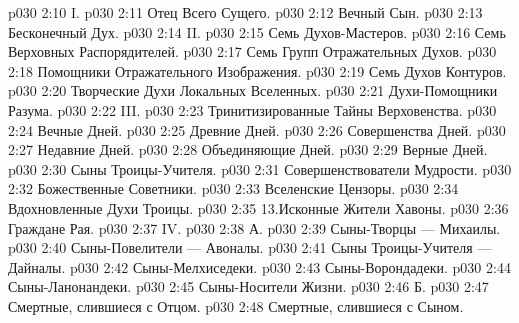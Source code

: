\vs p030 2:10 \pc I. 
\vs p030 2:11 \pc {}\bibnobreakspace Отец Всего Сущего.
\vs p030 2:12 \bibnobreakspace Вечный Сын.
\vs p030 2:13 \bibnobreakspace Бесконечный Дух.
\vs p030 2:14 \pc II. 
\vs p030 2:15 \bibnobreakspace Семь Духов\hyp{}Мастеров.
\vs p030 2:16 \bibnobreakspace Семь Верховных Распорядителей.
\vs p030 2:17 \bibnobreakspace Семь Групп Отражательных Духов.
\vs p030 2:18 \bibnobreakspace Помощники Отражательного Изображения.
\vs p030 2:19 \bibnobreakspace Семь Духов Контуров.
\vs p030 2:20 \bibnobreakspace Творческие Духи Локальных Вселенных.
\vs p030 2:21 \bibnobreakspace Духи\hyp{}Помощники Разума.
\vs p030 2:22 \pc III. 
\vs p030 2:23 \bibnobreakspace Тринитизированные Тайны Верховенства.
\vs p030 2:24 \bibnobreakspace Вечные Дней.
\vs p030 2:25 \bibnobreakspace Древние Дней.
\vs p030 2:26 \bibnobreakspace Совершенства Дней.
\vs p030 2:27 \bibnobreakspace Недавние Дней.
\vs p030 2:28 \bibnobreakspace Объединяющие Дней.
\vs p030 2:29 \bibnobreakspace Верные Дней.
\vs p030 2:30 \bibnobreakspace Сыны Троицы\hyp{}Учителя.
\vs p030 2:31 \bibnobreakspace Совершенствователи Мудрости.
\vs p030 2:32 \bibnobreakspace Божественные Советники.
\vs p030 2:33 \bibnobreakspace Вселенские Цензоры.
\vs p030 2:34 \bibnobreakspace Вдохновленные Духи Троицы.
\vs p030 2:35 13.Исконные Жители Хавоны.
\vs p030 2:36 \bibnobreakspace Граждане Рая.
\vs p030 2:37 \pc IV. 
\vs p030 2:38 \pc А. 
\vs p030 2:39 \bibnobreakspace Сыны\hyp{}Творцы --- Михаилы.
\vs p030 2:40 \bibnobreakspace Сыны\hyp{}Повелители --- Авоналы.
\vs p030 2:41 \bibnobreakspace Сыны Троицы\hyp{}Учителя --- Дайналы.
\vs p030 2:42 \bibnobreakspace Сыны\hyp{}Мелхиседеки.
\vs p030 2:43 \bibnobreakspace Сыны\hyp{}Ворондадеки.
\vs p030 2:44 \bibnobreakspace Сыны\hyp{}Ланонандеки.
\vs p030 2:45 \bibnobreakspace Сыны\hyp{}Носители Жизни.
\vs p030 2:46 \pc Б. 
\vs p030 2:47 \bibnobreakspace Смертные, слившиеся с Отцом.
\vs p030 2:48 \bibnobreakspace Смертные, слившиеся с Сыном.
